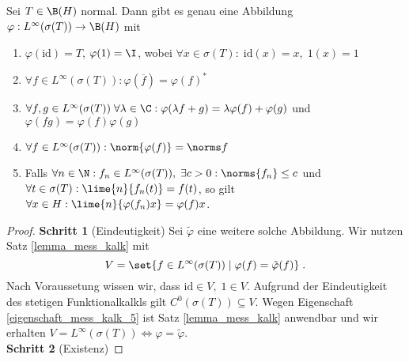 \begin{theorem}
	Sei \(T\in \B(H)\) normal. Dann gibt es genau eine Abbildung \(\varphi:L^\infty(\sigma(T)) \to \B(H)\) mit
	\begin{enumerate}
		\item \(\varphi(\text{id}) = T\), \(\varphi(1) = \I\), wobei \(\forall x\in \sigma(T): \; \text{id}(x) = x, \;1(x) = 1\)
		\item \(\forall f\in L^\infty(\sigma(T)): \varphi(\overline f) = \varphi(f)^*\)
		\item \(\forall f, g \in L^\infty(\sigma(T))\;\forall \lambda \in \C: \varphi(\lambda f + g) = \lambda \varphi(f) + \varphi(g)\)\; und \; \(\varphi(fg) = \varphi(f) \varphi(g)\)
		\item \(\forall f\in L^\infty(\sigma(T)): \norm{\varphi(f)} = \norms f\)
		\item Falls \(\forall n\in\N: f_n \in L^\infty(\sigma(T)),\;\exists c>0: \norms{f_n} \leq c\) und \(\forall t \in \sigma(T): \lime{n}{f_n(t)} = f(t)\), so gilt \(\forall x \in H: \lime{n}{\varphi(f_n)x} = \varphi(f)x\). \label{eigenschaft_mess_kalk_5}
	\end{enumerate}
\end{theorem}

\begin{proof}
	\textbf{Schritt 1} (Eindeutigkeit) Sei \(\tilde\varphi\) eine weitere solche Abbildung. Wir nutzen Satz \ref{lemma_mess_kalk} mit
	\[V = \set{f\in L^\infty(\sigma(T))\;\vert\; \varphi(f) = \tilde\varphi(f)}\;.\]
	Nach Voraussetung wissen wir, dass \(\text{id} \in V,\; 1 \in V\). Aufgrund der Eindeutigkeit des stetigen Funktionalkalk\us ls gilt \(C^0(\sigma(T)) \subseteq V\). Wegen Eigenschaft \ref{eigenschaft_mess_kalk_5} ist Satz \ref{lemma_mess_kalk} anwendbar und wir erhalten \(V = L^\infty(\sigma(T)) \iff \varphi = \tilde \varphi\).\\
	\textbf{Schritt 2} (Existenz) 
\end{proof}